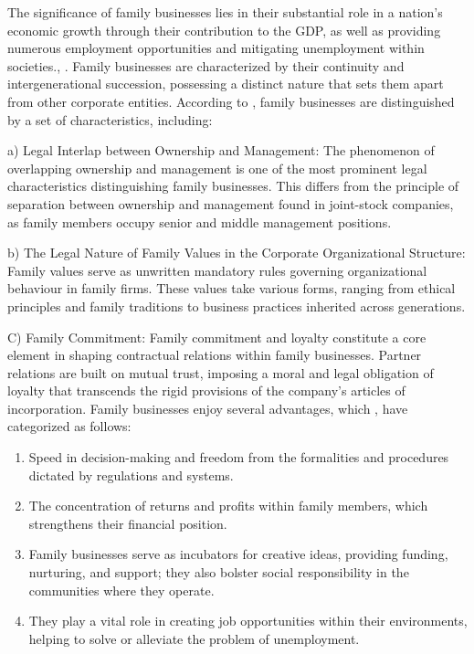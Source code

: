 \documentclass{default}
\begin{document}
The significance of family businesses lies in their substantial role in a nation's economic growth through their contribution to the GDP, as well as providing numerous employment opportunities and mitigating unemployment within societies.\cite{ref14}, \cite{ref15}. Family businesses are characterized by their continuity and intergenerational succession, possessing a distinct nature that sets them apart from other corporate entities. According to \cite{ref16}, family businesses are distinguished by a set of characteristics, including:

a) Legal Interlap between Ownership and Management: The phenomenon of overlapping ownership and management is one of the most prominent legal characteristics distinguishing family businesses. This differs from the principle of separation between ownership and management found in joint-stock companies, as family members occupy senior and middle management positions.

b) The Legal Nature of Family Values in the Corporate Organizational Structure: Family values serve as unwritten mandatory rules governing organizational behaviour in family firms. These values take various forms, ranging from ethical principles and family traditions to business practices inherited across generations.

C) Family Commitment: Family commitment and loyalty constitute a core element in shaping contractual relations within family businesses. Partner relations are built on mutual trust, imposing a moral and legal obligation of loyalty that transcends the rigid provisions of the company's articles of incorporation. Family businesses enjoy several advantages, which \cite{ref18}, \cite{ref17} have categorized as follows:

\begin{enumerate}
  \item Speed in decision-making and freedom from the formalities and procedures dictated by regulations and systems.
  \item The concentration of returns and profits within family members, which strengthens their financial position.
  \item Family businesses serve as incubators for creative ideas, providing funding, nurturing, and support; they also bolster social responsibility in the communities where they operate.
  \item They play a vital role in creating job opportunities within their environments, helping to solve or alleviate the problem of unemployment.
\end{enumerate}
\end{document}
